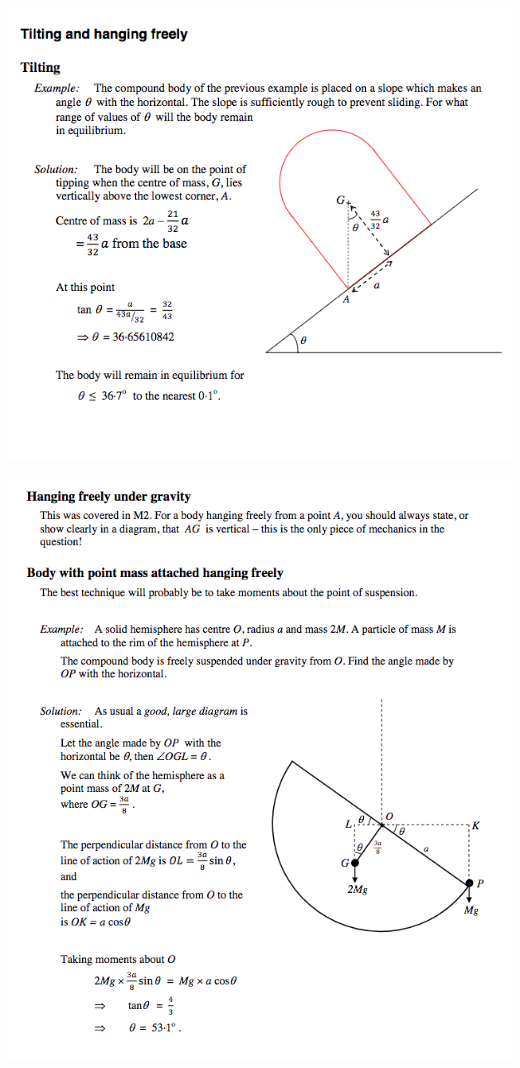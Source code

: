 \documentclass[a4paper]{article}
\begin{document}
\begin{center}
    \includegraphics[scale=0.5]{img_M/14_intro7}
\end{center}
\begin{center}
    \includegraphics[scale=0.5]{img_M/14_eg3}
\end{center}
\end{document}
